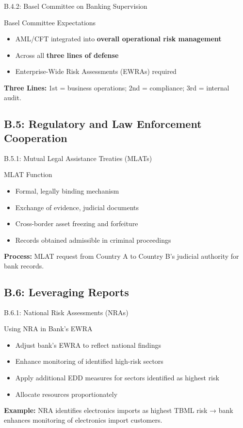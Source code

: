 \documentclass{beamer}
\begin{document}
	\begin{frame}{B.4.2: Basel Committee on Banking Supervision}
		\begin{block}{Basel Committee Expectations}
			\begin{itemize}
				\item AML/CFT integrated into \textbf{overall operational risk management}
				\item Across all \textbf{three lines of defense}
				\item Enterprise-Wide Risk Assessments (EWRAs) required
			\end{itemize}
		\end{block}
		\textbf{Three Lines:} 1st = business operations; 2nd = compliance; 3rd = internal audit.
	\end{frame}
	
	\subsection{B.5: Regulatory and Law Enforcement Cooperation}
	
	\begin{frame}{B.5.1: Mutual Legal Assistance Treaties (MLATs)}
		\begin{block}{MLAT Function}
			\begin{itemize}
				\item Formal, legally binding mechanism
				\item Exchange of evidence, judicial documents
				\item Cross-border asset freezing and forfeiture
				\item Records obtained admissible in criminal proceedings
			\end{itemize}
		\end{block}
		\textbf{Process:} MLAT request from Country A to Country B's judicial authority for bank records.
	\end{frame}
	
	\subsection{B.6: Leveraging Reports}
	
	\begin{frame}{B.6.1: National Risk Assessments (NRAs)}
		\begin{block}{Using NRA in Bank's EWRA}
			\begin{itemize}
				\item Adjust bank's EWRA to reflect national findings
				\item Enhance monitoring of identified high-risk sectors
				\item Apply additional EDD measures for sectors identified as highest risk
				\item Allocate resources proportionately
			\end{itemize}
		\end{block}
		\textbf{Example:} NRA identifies electronics imports as highest TBML risk → bank enhances monitoring of electronics import customers.
	\end{frame}
	
\end{document}
